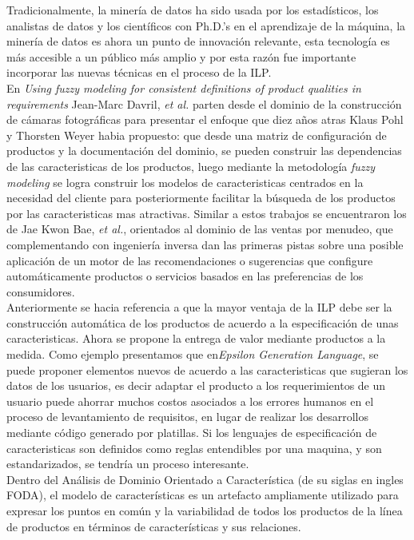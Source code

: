  Tradicionalmente, la minería de datos ha sido usada por los estadísticos, los analistas de datos y los científicos con Ph.D.'s en el aprendizaje de la máquina\cite{Hornick2009}, la minería de datos es ahora un punto de innovación relevante, esta tecnología es más accesible a un público más amplio y por esta razón fue importante incorporar las nuevas técnicas en el proceso de la ILP.\\
En \textit{Using fuzzy modeling for consistent definitions of product qualities in requirements}\cite{Davril2015b} Jean-Marc Davril, \textit{et al.} parten desde el dominio de la construcción de cámaras fotográficas para presentar el enfoque que diez años atras Klaus Pohl y Thorsten Weyer\cite{Pohl2005} habia propuesto: que desde una matriz de configuración de productos y la documentación del dominio, se pueden construir las dependencias de las caracteristicas de los productos,  luego mediante la metodología \textit{fuzzy modeling} se logra construir los modelos de caracteristicas centrados en la necesidad del cliente para posteriormente facilitar la búsqueda de los productos por las caracteristicas mas atractivas. Similar a estos trabajos se encuentraron los de Jae Kwon Bae, \textit{et al.}\cite{Bae2011}, orientados al dominio de las ventas por menudeo, que complementando con ingeniería inversa dan las primeras pistas sobre una posible aplicación de un motor de las recomendaciones o sugerencias que configure automáticamente productos o servicios basados en las preferencias de los consumidores. \\
Anteriormente se hacia referencia a que la mayor ventaja de la ILP debe ser la construcción automática de los productos de acuerdo a la  especificación de unas caracteristicas. Ahora se propone la entrega de valor mediante productos a la medida. Como ejemplo presentamos que en\textit{Epsilon Generation Language}\cite{Pablo2012}, se puede proponer elementos nuevos de acuerdo a las caracteristicas que sugieran los datos de los usuarios, es decir adaptar el producto a los requerimientos de un usuario puede ahorrar muchos costos asociados a los errores humanos en el proceso de levantamiento de requisitos,  en lugar de realizar los desarrollos mediante código generado por platillas. Si los lenguajes de especificación de caracteristicas son definidos como reglas entendibles por una maquina, y son estandarizados, se tendría un proceso interesante.\\
Dentro del Análisis de Dominio Orientado a Característica (de su siglas en ingles FODA), el modelo de características es un artefacto ampliamente utilizado para expresar los puntos en común y la variabilidad de todos los productos de la línea de productos en términos de características y sus relaciones\cite{Lian2015}. \\
